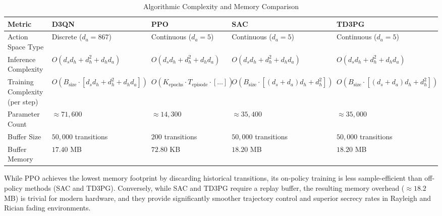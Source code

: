 \begin{table}[h!]
\caption{Algorithmic Complexity and Memory Comparison}
\label{tab:complexity_summary}
\centering
\begin{tabular}{lllll}
\toprule
\textbf{Metric} & \textbf{D3QN} & \textbf{PPO} & \textbf{SAC} & \textbf{TD3PG} \\
\midrule
Action Space Type & Discrete ($d_a = 867$) & Continuous ($d_a = 5$) & Continuous ($d_a = 5$) & Continuous ($d_a = 5$) \\
Inference Complexity & $O(d_s d_h + d_h^2 + d_h d_a)$ & $O(d_s d_h + d_h^2 + d_h d_a)$ & $O(d_s d_h + d_h^2 + d_h d_a)$ & $O(d_s d_h + d_h^2 + d_h d_a)$ \\
Training Complexity (per step) & $O(B_{\text{size}} \cdot [d_s d_h + d_h^2 + d_h d_a])$ & $O(K_{\text{epochs}} \cdot T_{\text{episode}} \cdot [\dots])$ & $O(B_{\text{size}} \cdot [(d_s+d_a)d_h + d_h^2])$ & $O(B_{\text{size}} \cdot [(d_s+d_a)d_h + d_h^2])$ \\
Parameter Count & $\approx 71,600$ & $\approx 14,300$ & $\approx 35,400$ & $\approx 35,000$ \\
Buffer Size & $50,000$ transitions & $200$ transitions & $50,000$ transitions & $50,000$ transitions \\
Buffer Memory & $17.40$ MB & $72.80$ KB & $18.20$ MB & $18.20$ MB \\
\bottomrule
\end{tabular}
\end{table}

While PPO achieves the lowest memory footprint by discarding historical transitions, its on-policy training is less sample-efficient than off-policy methods (SAC and TD3PG). Conversely, while SAC and TD3PG require a replay buffer, the resulting memory overhead ($\approx 18.2$ MB) is trivial for modern hardware, and they provide significantly smoother trajectory control and superior secrecy rates in Rayleigh and Rician fading environments.
